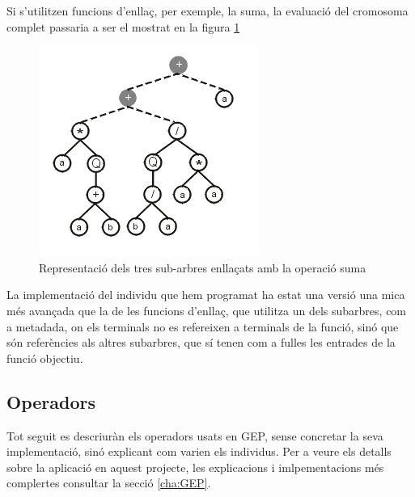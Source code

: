 Si s'utilitzen funcions d'enllaç, per exemple, la suma, la evaluació del
cromosoma complet passaria a ser el mostrat en la figura 
\ref{fig:tres sub-et amb link}

\begin{figure}[h!]
\begin{center}
\includegraphics{geptut/pt03b.png}
\end{center}
\caption{Representació dels tres sub-arbres enllaçats amb la operació suma}
\label{fig:tres sub-et amb link}
\end{figure}

La implementació del individu que hem programat ha estat una versió una mica més
avançada que la de les funcions d'enllaç, que utilitza un dels subarbres, com a
metadada, on els terminals no es refereixen a terminals de la funció, sinó que
són referències als altres subarbres, que sí tenen com a fulles les entrades de
la funció objectiu.



\subsection{Operadors} %
\label{sub:Operadors}

Tot seguit es descriuràn els operadors usats en GEP, sense concretar la seva
implementació, sinó explicant com varien els individus.  Per a veure els
detalls sobre la aplicació en aquest projecte, les explicacions i
imlpementacions més complertes consultar la secció \ref{cha:GEP}.

